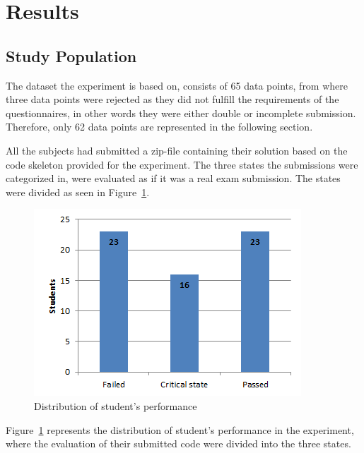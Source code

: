 \documentclass{sig-alternate-05-2015}
\begin{document}
\section{Results}

\subsection{Study Population}
\label{DemograpichInformation}
The dataset the experiment is based on, consists of 65 data points, from where three data points were rejected as they did not fulfill the requirements of the questionnaires, in other words they were either double or incomplete submission. Therefore, only 62 data points are represented in the following section.

All the subjects had submitted a zip-file containing their solution based on the code skeleton provided for the experiment. The three states the submissions were categorized in, were evaluated as if it was a real exam submission.
The states were divided as seen in Figure~\ref{fig:DistributionOfStudentPerformance}.

\begin{figure}[!ht]
	\centering
	\includegraphics[width=1\linewidth]{img01}
	\caption{Distribution of student's performance}
	\label{fig:DistributionOfStudentPerformance}
\end{figure}
Figure~\ref{fig:DistributionOfStudentPerformance} represents the distribution of student's performance in the experiment, where the evaluation of their submitted code were divided into the three states.\\
\end{document}

